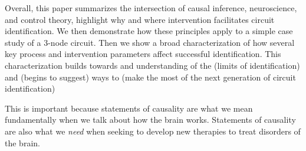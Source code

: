 Overall, this paper summarizes the intersection of causal inference, neuroscience, and control theory, highlight why and where intervention facilitates circuit identification. We then demonstrate how these principles apply to a simple case study of a 3-node circuit. Then we show a broad characterization of how several key process and intervention parameters affect successful identification. This characterization builds towards and understanding of the (limits of identification) and (begins to suggest) ways to (make the most of the next generation of circuit identification) 

This is important because statements of causality are what we mean fundamentally when we talk about how the brain works. Statements of causality are also what we \textit{need} when seeking to develop new therapies to treat disorders of the brain.